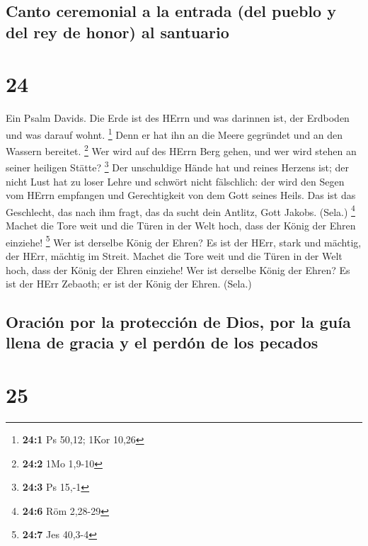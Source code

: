 \hypertarget{canto-ceremonial-a-la-entrada-del-pueblo-y-del-rey-de-honor-al-santuario}{%
\subsection{Canto ceremonial a la entrada (del pueblo y del rey de
honor) al
santuario}\label{canto-ceremonial-a-la-entrada-del-pueblo-y-del-rey-de-honor-al-santuario}}

\hypertarget{section-23}{%
\section{24}\label{section-23}}

 Ein Psalm Davids. Die Erde ist des HErrn und was darinnen
ist, der Erdboden und was darauf wohnt. \footnote{\textbf{24:1} Ps
  50,12; 1Kor 10,26}  Denn er hat ihn an die Meere
gegründet und an den Wassern bereitet. \footnote{\textbf{24:2} 1Mo
  1,9-10}  Wer wird auf des HErrn Berg gehen, und wer wird
stehen an seiner heiligen Stätte? \footnote{\textbf{24:3} Ps 15,-1}
 Der unschuldige Hände hat und reines Herzens ist; der
nicht Lust hat zu loser Lehre und schwört nicht fälschlich:
 der wird den Segen vom HErrn empfangen und Gerechtigkeit
von dem Gott seines Heils.  Das ist das Geschlecht, das
nach ihm fragt, das da sucht dein Antlitz, Gott Jakobs. (Sela.)
\footnote{\textbf{24:6} Röm 2,28-29}  Machet die Tore weit
und die Türen in der Welt hoch, dass der König der Ehren einziehe!
\footnote{\textbf{24:7} Jes 40,3-4}  Wer ist derselbe
König der Ehren? Es ist der HErr, stark und mächtig, der HErr, mächtig
im Streit.  Machet die Tore weit und die Türen in der Welt
hoch, dass der König der Ehren einziehe!  Wer ist
derselbe König der Ehren? Es ist der HErr Zebaoth; er ist der König der
Ehren. (Sela.)

\hypertarget{oraciuxf3n-por-la-protecciuxf3n-de-dios-por-la-guuxeda-llena-de-gracia-y-el-perduxf3n-de-los-pecados}{%
\subsection{Oración por la protección de Dios, por la guía llena de
gracia y el perdón de los
pecados}\label{oraciuxf3n-por-la-protecciuxf3n-de-dios-por-la-guuxeda-llena-de-gracia-y-el-perduxf3n-de-los-pecados}}

\hypertarget{section-24}{%
\section{25}\label{section-24}}

